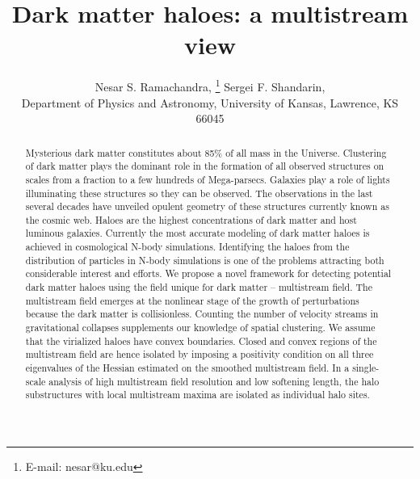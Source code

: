 \documentclass[fleqn,usenatbib,useAMS]{mnras}
\begin{document}
\label{firstpage}
\pagerange{\pageref{firstpage}--\pageref{lastpage}}

\title[Dark matter haloes: a multistream view]{Dark matter haloes: a multistream view}

\author[Ramachandra \& Shandarin]
	{Nesar S. Ramachandra, \thanks{E-mail: nesar@ku.edu} 
	Sergei F. Shandarin, \\
	Department of Physics and Astronomy, University of Kansas, Lawrence, KS 66045}



\maketitle
\begin{abstract}

Mysterious dark matter constitutes about 85\% of all mass in the Universe. Clustering of dark matter plays the dominant role in the formation of all observed structures on scales from a fraction to a few hundreds of Mega-parsecs. Galaxies play a role of lights illuminating these structures so they can be observed. The observations in the last several decades have unveiled opulent geometry of these structures currently known as the cosmic web. Haloes are the highest concentrations of dark matter and host luminous galaxies. Currently the most accurate modeling of dark matter haloes is achieved in cosmological N-body simulations. Identifying the haloes from the distribution of particles in N-body simulations is one of the problems attracting both considerable interest and efforts. We propose a novel framework for detecting potential dark matter haloes using the field unique for dark matter  -- multistream field. The multistream field emerges at the nonlinear stage of the growth of perturbations because the dark matter is collisionless. Counting the number of velocity streams in gravitational collapses supplements our knowledge of spatial clustering. We assume that the virialized haloes have convex boundaries. Closed and convex regions of the multistream field are hence isolated by imposing a positivity condition on all three eigenvalues of the Hessian estimated on the smoothed multistream field. In a single-scale analysis of high multistream field resolution and low softening length, the halo substructures with local multistream maxima are isolated as individual halo sites.



\end{abstract}
\end{document}
